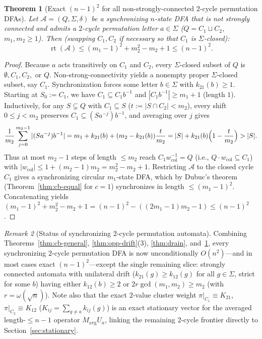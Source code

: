\documentclass[11pt,a4paper]{article}
\newtheorem{theorem}{Theorem}[section]
\theoremstyle{definition}
\theoremstyle{remark}
\newtheorem{remark}[theorem]{Remark}
\newcommand{\rt}{\operatorname{rt}}
\newcommand{\cA}{\mathcal{A}}
\begin{document}
\begin{theorem}[Exact $(n-1)^2$ for all non-strongly-connected $2$-cycle permutation DFAs]
\label{thm:nonsc}
Let $\cA = (Q, \Sigma, \delta)$ be a synchronizing $n$-state DFA that is \emph{not strongly connected} and admits a $2$-cycle permutation letter $a \in \Sigma$ ($Q = C_1 \sqcup C_2$, $m_1, m_2 \ge 1$). Then (swapping $C_1, C_2$ if necessary so that $C_1$ is $\Sigma$-closed):
\[
  \rt(\cA) \le (m_1 - 1)^2 + m_2^2 - m_2 + 1 \le (n - 1)^2.
\]
\end{theorem}
\begin{proof}
Because $a$ acts transitively on $C_1$ and $C_2$, every $\Sigma$-closed subset of $Q$ is $\emptyset, C_1, C_2,$ or $Q$. Non-strong-connectivity yields a nonempty proper $\Sigma$-closed subset, say $C_1$. Synchronization forces some letter $b \in \Sigma$ with $k_{21}(b) \ge 1$. Starting at $S_0 := C_1$, we have $C_1 \subseteq C_1 b^{-1}$ and $|C_1 b^{-1}| \ge m_1 + 1$ (length $1$). Inductively, for any $S \subsetneq Q$ with $C_1 \subseteq S$ ($t := |S \cap C_2| < m_2$), every shift $0 \le j < m_2$ preserves $C_1 \subseteq (S a^{-j}) b^{-1}$, and averaging over $j$ gives
\[
  \frac{1}{m_2}\sum_{j=0}^{m_2-1} |(S a^{-j})b^{-1}| = m_1 + k_{21}(b) + (m_2 - k_{21}(b))\frac{t}{m_2} = |S| + k_{21}(b)\Bigl(1 - \frac{t}{m_2}\Bigr) > |S|.
\]
Thus at most $m_2 - 1$ steps of length $\le m_2$ reach $C_1 w_{\mathrm{col}}^{-1} = Q$ (i.e., $Q \cdot w_{\mathrm{col}} \subseteq C_1$) with $|w_{\mathrm{col}}| \le 1 + (m_2 - 1)m_2 = m_2^2 - m_2 + 1$. Restricting $\cA$ to the closed cycle $C_1$ gives a synchronizing circular $m_1$-state DFA, which by Dubuc's theorem (Theorem~\ref{thm:cb-equal} for $c = 1$) synchronizes in length $\le (m_1 - 1)^2$. Concatenating yields $(m_1 - 1)^2 + m_2^2 - m_2 + 1 = (n - 1)^2 - ((2m_1 - 1)m_2 - 1) \le (n - 1)^2$.
\end{proof}

\begin{remark}[Status of synchronizing $2$-cycle permutation automata]
\label{rem:2cycle-taxonomy}
Combining Theorems~\ref{thm:cb-general}, \ref{thm:opp-drift}(3), \ref{thm:drain}, and~\ref{thm:nonsc}, every synchronizing $2$-cycle permutation DFA is now unconditionally $O(n^2)$---and in most cases exact $(n-1)^2$---except the single remaining slice: strongly connected automata with unilateral drift ($k_{21}(g) \ge k_{12}(g)$ for all $g \in \Sigma$, strict for some $b$) having either $k_{12}(b) \ge 2$ or $2r \gcd(m_1, m_2) \ge m_2$ (with $r = \omega(\sqrt{n})$). Note also that the exact $2$-value cluster weight $\pi|_{C_1} \equiv K_{21}$, $\pi|_{C_2} \equiv K_{12}$ ($K_{ij} = \sum_{g \neq a} k_{ij}(g)$) is an exact stationary vector for the averaged length-$\le n-1$ operator $M_{\mathrm{avg}} U_a$, linking the remaining $2$-cycle frontier directly to Section~\ref{sec:stationary}.
\end{remark}
\end{document}
